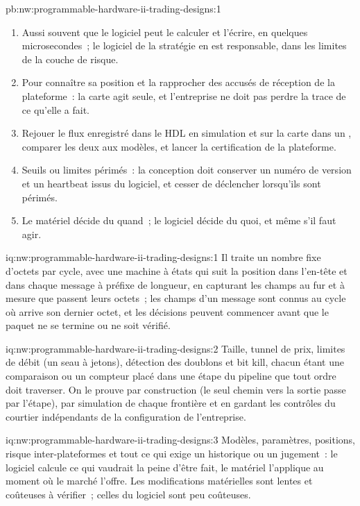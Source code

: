 \begin{solution}{pb:nw:programmable-hardware-ii-trading-designs:1}
\begin{enumerate}
\item Aussi souvent que le logiciel peut le calculer et l'écrire, en quelques microsecondes~; le logiciel de la stratégie en est responsable, dans les limites de la couche de risque.
\item Pour connaître sa position et la rapprocher des accusés de réception de la plateforme~: la carte agit seule, et l'entreprise ne doit pas perdre la trace de
  ce qu'elle a fait.
\item Rejouer le flux enregistré dans le HDL en simulation et sur la carte dans un , comparer les deux aux modèles, et lancer
  la certification de la plateforme.
\item Seuils ou limites périmés~: la conception doit conserver un numéro de version et un heartbeat issus du logiciel, et cesser de déclencher lorsqu'ils sont
  périmés.
\item Le matériel décide du quand~; le logiciel décide du quoi, et même s'il faut agir.
\end{enumerate}
\end{solution}

\begin{solution}{iq:nw:programmable-hardware-ii-trading-designs:1}
Il traite un nombre fixe d'octets par cycle, avec une machine à états qui suit la position dans l'en-tête et dans chaque message à préfixe de
longueur, en capturant les champs au fur et à mesure que passent leurs octets~; les champs d'un message sont connus au cycle où arrive son dernier octet, et les décisions peuvent commencer
avant que le paquet ne se termine ou ne soit vérifié.
\end{solution}

\begin{solution}{iq:nw:programmable-hardware-ii-trading-designs:2}
Taille, tunnel de prix, limites de débit (un seau à jetons), détection des doublons et bit kill, chacun étant une comparaison ou un compteur placé dans une étape du pipeline que
tout ordre doit traverser. On le prouve par construction (le seul chemin vers la sortie passe par l'étape), par simulation de chaque frontière et
en gardant les contrôles du courtier indépendants de la configuration de l'entreprise.
\end{solution}

\begin{solution}{iq:nw:programmable-hardware-ii-trading-designs:3}
Modèles, paramètres, positions, risque inter-plateformes et tout ce qui exige un historique ou un jugement~: le logiciel calcule ce qui vaudrait la peine d'être fait,
le matériel l'applique au moment où le marché l'offre. Les modifications matérielles sont lentes et coûteuses à vérifier~; celles du logiciel sont peu coûteuses.
\end{solution}

